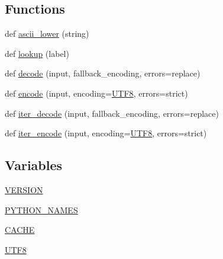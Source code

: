 \subsection*{Functions}
\begin{DoxyCompactItemize}
\item 
def \hyperlink{namespacepip_1_1__vendor_1_1webencodings_afa97e391f2b68992094a339176eff233}{ascii\+\_\+lower} (string)
\item 
def \hyperlink{namespacepip_1_1__vendor_1_1webencodings_ae558e10f94082a6e5104e4a19de375eb}{lookup} (label)
\item 
def \hyperlink{namespacepip_1_1__vendor_1_1webencodings_a8de11e3f8c23c682f8e367d23462a5d0}{decode} (input, fallback\+\_\+encoding, errors=\textquotesingle{}replace\textquotesingle{})
\item 
def \hyperlink{namespacepip_1_1__vendor_1_1webencodings_af737f45c9207721a90c25219dbc89288}{encode} (input, encoding=\hyperlink{namespacepip_1_1__vendor_1_1webencodings_a2eb014d3f6305ba50ece3cad231b60bf}{U\+T\+F8}, errors=\textquotesingle{}strict\textquotesingle{})
\item 
def \hyperlink{namespacepip_1_1__vendor_1_1webencodings_a45fec086851d9f7d2af7ae7715dfa50c}{iter\+\_\+decode} (input, fallback\+\_\+encoding, errors=\textquotesingle{}replace\textquotesingle{})
\item 
def \hyperlink{namespacepip_1_1__vendor_1_1webencodings_aa5411167f6851dbd04d5813b7da22380}{iter\+\_\+encode} (input, encoding=\hyperlink{namespacepip_1_1__vendor_1_1webencodings_a2eb014d3f6305ba50ece3cad231b60bf}{U\+T\+F8}, errors=\textquotesingle{}strict\textquotesingle{})
\end{DoxyCompactItemize}
\subsection*{Variables}
\begin{DoxyCompactItemize}
\item 
\hyperlink{namespacepip_1_1__vendor_1_1webencodings_a33c958bba3b37600102a9ea1c3140e12}{V\+E\+R\+S\+I\+ON}
\item 
\hyperlink{namespacepip_1_1__vendor_1_1webencodings_a7193e9e0062f7b2533caa43ad9918bcf}{P\+Y\+T\+H\+O\+N\+\_\+\+N\+A\+M\+ES}
\item 
\hyperlink{namespacepip_1_1__vendor_1_1webencodings_a99b3ec77071e1286ccce1c9d509cfa39}{C\+A\+C\+HE}
\item 
\hyperlink{namespacepip_1_1__vendor_1_1webencodings_a2eb014d3f6305ba50ece3cad231b60bf}{U\+T\+F8}
\end{DoxyCompactItemize}


